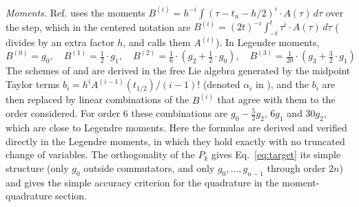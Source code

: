 \documentclass[12pt]{article}
\begin{document}
\emph{Moments.} Ref. \cite{bcr2002} uses the moments $B^{(i)}=h^{-i}\int(\tau-t_{n}-h/2)^{i}\cdot A(\tau)\,d\tau$ over the step, which in the centered notation are $B^{(i)}=(2t)^{-i}\int_{-t}^{t}\tau^{i}\cdot A(\tau)\,d\tau$ (\cite{bcr2000} divides by an extra factor $h$, and \cite{bcor2009} calls them $A^{(i)}$). In Legendre moments,
\begin{equation}
B^{(0)}=g_{0},\quad B^{(1)}=\tfrac{1}{2}\cdot g_{1},\quad B^{(2)}=\tfrac{1}{6}\cdot(g_{2}+\tfrac{1}{2}\cdot g_{0}),\quad B^{(3)}=\tfrac{1}{20}\cdot(g_{3}+\tfrac{3}{2}\cdot g_{1})\label{eq:bmom}
\end{equation}
The schemes of \cite{bcr2002} and \cite{bcor2009} are derived in the free Lie algebra generated by the midpoint Taylor terms $b_i=h^{i}A^{(i-1)}(t_{1/2})/(i-1)!$ (denoted $\alpha_i$ in \cite{bcor2009}), and the $b_i$ are then replaced by linear combinations of the $B^{(i)}$ that agree with them to the order considered. For order 6 these combinations are $g_0-\frac{5}{2}g_2$, $6g_1$ and $30g_2$, which are close to Legendre moments. Here the formulas are derived and verified directly in the Legendre moments, in which they hold exactly with no truncated change of variables. The orthogonality of the $P_k$ gives Eq.~\ref{eq:target} its simple structure (only $g_0$ outside commutators, and only $g_0,\ldots,g_{n-1}$ through order $2n$) and gives the simple accuracy criterion for the quadrature in the moment-quadrature section.
\end{document}
